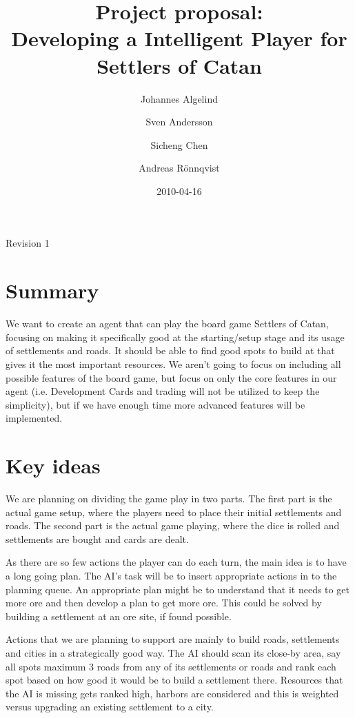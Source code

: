 \documentclass[]{article}
\title{Project proposal:\\Developing a Intelligent Player for Settlers of Catan}
\author{Johannes Algelind
\and Sven Andersson
\and Sicheng Chen
\and Andreas Rönnqvist}
\date{2010-04-16}
\begin{document}
\ifpdf
{}
\else
{}
\fi

\maketitle

\begin{center}
  Revision 1
\end{center}


\section{Summary}
  We want to create an agent that can play the board game Settlers of Catan, focusing on making it specifically good at the starting/setup stage and its usage of settlements and roads. It should be able to find good spots to build at that gives it the most important resources. We aren't going to focus on including all possible features of the board game, but focus on only the core features in our agent (i.e. Development Cards and trading will not be utilized to keep the simplicity), but if we have enough time more advanced features will be implemented.

\section{Key ideas}
We are planning on dividing the game play in two parts. The first part is the actual game setup, where the players need to place their initial settlements and roads. The second part is the actual game playing, where the dice is rolled and settlements are bought and cards are dealt.

As there are so few actions the player can do each turn, the main idea is to have a long going plan. The AI's task will be to insert appropriate actions in to the planning queue. An appropriate plan might be to understand that it needs to get more ore and then develop a plan to get more ore. This could be solved by building a settlement at an ore site, if found possible.

Actions that we are planning to support are mainly to build roads, settlements and cities in a strategically good way. The AI should scan its close-by area, say all spots maximum 3 roads from any of its settlements or roads and rank each spot based on how good it would be to build a settlement there. Resources that the AI is missing gets ranked high, harbors are considered and this is weighted versus upgrading an existing settlement to a city.
\end{document}
